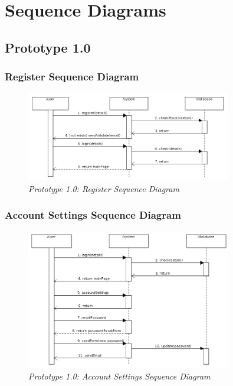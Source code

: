 \documentclass[12pt,twoside,a4paper]{report}
\begin{document}
\section{Sequence Diagrams}\label{3.6}
\subsection{Prototype 1.0}\label{3.6.1}
\subsubsection{Register Sequence Diagram}\label{3.6.1.1}
\begin{figure}[!ht]
	\centering
		\includegraphics[width=0.8\textwidth, totalheight=5.5cm]{register_sequence_diagram}
	\caption{\textit{Prototype 1.0: Register Sequence Diagram}}
	\label{f3.6.1.1}
\end{figure}

\subsubsection{Account Settings Sequence Diagram}\label{3.6.1.2}
\begin{figure}[!ht]
	\centering
		\includegraphics[width=0.8\textwidth, totalheight=6cm]{account_settings_sequence_diagram}
	\caption{\textit{Prototype 1.0: Account Settings Sequence Diagram}}
	\label{f3.6.1.2}
\end{figure}
\end{document}
